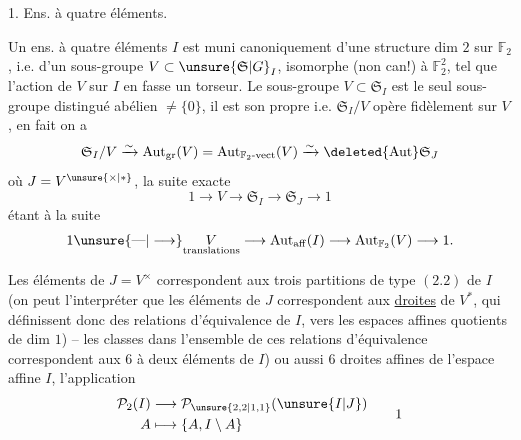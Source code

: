 1. Ens. à quatre éléments.

Un ens. à quatre éléments $I$ est muni canoniquement d'une structure   dim $2$ sur $\mathbb{F}_2$, i.e. d'un sous-groupe $V\subset\unsure{\mathfrak{S}|G}_I$, isomorphe (non can!) à $\mathbb{F}_2^2$, tel que l'action de $V$ sur  $I$ en fasse un torseur. Le sous-groupe $V\subset\mathfrak{S}_I$ est le seul sous-groupe distingué abélien $\ne\{0\}$,  il est son propre   i.e. $\mathfrak{S}_I/V$ opère fidèlement sur $V$, en fait on a
\[
\mathfrak{S}_I/V\xrightarrow{\sim}\mathrm{Aut}_{\mathrm{gr}}(V)=\mathrm{Aut}_{\mathbb{F}_2\text{-vect}}(V)\xrightarrow{\sim}\deleted{\mathrm{Aut}}\mathfrak{S}_J
\]
où $J=V^{\unsure{\times|*}}$, la suite exacte
\[
1\longrightarrow V\longrightarrow\mathfrak{S}_I\longrightarrow\mathfrak{S}_J\longrightarrow1
\]
étant   à la suite
\[
1\unsure{\text{---}|\longrightarrow}\underset{\text{translations}}{V}\longrightarrow\mathrm{Aut}_{\mathrm{aff}}(I)\longrightarrow\mathrm{Aut}_{\mathbb{F}_2}(V)\longrightarrow1.
\]

Les  éléments de $J=V^{\times}$ correspondent aux trois partitions de type $(2.2)$ de $I$
(on peut l'interpréter  que les éléments de $J$ correspondent aux \uline{droites}  de $V^{*}$, qui définissent  donc des  relations d'équivalence de $I$, vers les espaces affines quotients de dim $1$) -- les classes  dans l'ensemble de ces  relations d'équivalence correspondent aux $6$   à deux éléments de $I$) ou aussi  $6$ droites affines de l'espace affine $I$, l'application
\[
\begin{aligned}
\mathcal{P}_2(I)&\longrightarrow\mathcal{P}_{\unsure{2,2|1,1}}(\unsure{I|J})\\
A&\longmapsto\{A,I\setminus A\}
\end{aligned}\tag*{1}
\]
